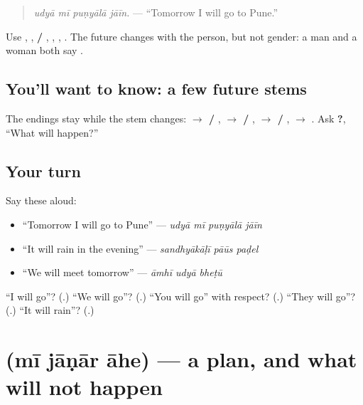 \begin{quote}
\emph{udyā mī puṇyālā jāīn.} — \textquotedblleft{}Tomorrow I will go to Pune.\textquotedblright{}
\end{quote}

Use \textbf{ }, \textbf{ }, \textbf{ /  }, \textbf{ }, \textbf{ }, \textbf{ }. The future changes with the person, but not gender: a man and a woman both say \textbf{ }.

\subsection*{You'll want to know: a few future stems}
The endings stay while the stem changes: \textbf{ $\to$  / }, \textbf{ $\to$  / }, \textbf{ $\to$  / }, \textbf{ $\to$ }. Ask \textbf{ ?}, \textquotedblleft{}What will happen?\textquotedblright{}

\subsection*{Your turn}
Say these aloud:

\begin{itemize}
\raggedright
  \item \textquotedblleft{}Tomorrow I will go to Pune\textquotedblright{} — \emph{udyā mī puṇyālā jāīn}
  \item \textquotedblleft{}It will rain in the evening\textquotedblright{} — \emph{sandhyākāḷī pāūs paḍel}
  \item \textquotedblleft{}We will meet tomorrow\textquotedblright{} — \emph{āmhī udyā bheṭū}
\end{itemize}

\begin{tcolorbox}[breakable,colback=teal!4,colframe=teal!35!black,title={Before you move on}]
\textquotedblleft{}I will go\textquotedblright{}? (\textbf{}.) \textquotedblleft{}We will go\textquotedblright{}? (\textbf{}.) \textquotedblleft{}You will go\textquotedblright{} with respect? (\textbf{}.) \textquotedblleft{}They will go\textquotedblright{}? (\textbf{}.) \textquotedblleft{}It will rain\textquotedblright{}? (\textbf{}.)
\end{tcolorbox}
\section[\texorpdfstring{\mr{मी} \mr{जाणार} \mr{आहे} (mī jāṇār āhe)}{मी जाणार आहे (mī jāṇār āhe)}]{   (mī jāṇār āhe) — a plan, and what will not happen}

